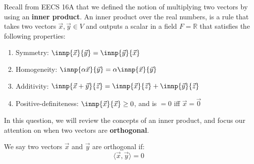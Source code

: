 

Recall from EECS 16A that we defined the notion of multiplying two vectors by using an \textbf{inner product}.
An inner product over the real numbers, is a rule that takes two vectors $\vec{x}, \vec{y} \in V$ and outputs a scalar in a field $F = \mathbb{R}$ that satisfies the following properties:
\begin{enumerate}[label=(\roman*)]
  \item Symmetry: $\innp{\vec{x}}{\vec{y}} = \innp{\vec{y}}{\vec{x}}$
  \item Homogeneity: $\innp{\alpha \vec{x}}{\vec{y}} = \alpha \innp{\vec{x}}{\vec{y}}$
  \item Additivity: $\innp{\vec{x}+\vec{y}}{\vec{z}} = \innp{\vec{x}}{\vec{z}} + \innp{\vec{y}}{\vec{z}}$
  \item Positive-definiteness: $\innp{\vec{x}}{\vec{x}} \geq 0$, and is $= 0$ iff $\vec{x} = \vec{0}$
\end{enumerate}


In this question, we will review the concepts of an inner product, and focus our attention on when two vectors are \textbf{orthogonal}.

We say two vectors $\vec{x}$ and $\vec{y}$ are orthogonal if:
\begin{equation}
  \langle \vec{x}, \vec{y} \rangle = 0
\end{equation}

